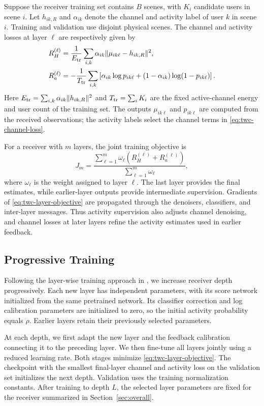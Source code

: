 Suppose the receiver training set contains $B$ scenes, with $K_i$
candidate users in scene $i$. Let $h_{ik,R}$ and $\alpha_{ik}$
denote the channel and activity label of user $k$ in scene $i$.
Training and validation use disjoint physical scenes.
The channel and activity losses at layer $\ell$ are respectively
given by
\begin{align}
 R_H^{(\ell)}&=\frac{1}{E_{\rm tr}}\sum_{i,k}
       \alpha_{ik}\|\mu_{ik\ell}-h_{ik,R}\|^2,
 \label{eq:twc-channel-loss}\\
 R_a^{(\ell)}&=-\frac{1}{T_{\rm tr}}\sum_{i,k}
       \left[\alpha_{ik}\log p_{ik\ell}
       +(1-\alpha_{ik})\log(1-p_{ik\ell})\right].
 \label{eq:twc-activity-loss}
\end{align}
Here $E_{\rm tr}=\sum_{i,k}\alpha_{ik}\|h_{ik,R}\|^2$ and
$T_{\rm tr}=\sum_i K_i$ are the fixed active-channel energy and user
count of the training set. The outputs $\mu_{ik\ell}$ and $p_{ik\ell}$
are computed from the received observations; the activity labels
select the channel terms in \eqref{eq:twc-channel-loss}.

For a receiver with $m$ layers, the joint training objective is
\begin{equation}
 J_m=\frac{\sum_{\ell=1}^{m}\omega_\ell
                  \left(R_H^{(\ell)}+R_a^{(\ell)}\right)}
                 {\sum_{\ell=1}^{m}\omega_\ell},
 \label{eq:twc-layer-objective}
\end{equation}
where $\omega_\ell$ is the weight assigned to layer $\ell$.
The last layer provides the final estimates, while earlier-layer
outputs provide intermediate supervision.
Gradients of \eqref{eq:twc-layer-objective} are propagated through
the denoisers, classifiers, and inter-layer messages. Thus activity
supervision also adjusts channel denoising, and channel losses at later
layers refine the activity estimates used in earlier feedback.

\subsection{Progressive Training}

Following the layer-wise training approach in \cite{wei2026}, we
increase receiver depth progressively. Each new layer has independent
parameters, with its score network initialized from the same
pretrained network.
Its classifier correction and log calibration parameters are
initialized to zero, so the initial activity probability equals $\rho$.
Earlier layers retain their previously selected parameters.

At each depth, we first adapt the new layer and the feedback
calibration connecting it to the preceding layer. We then fine-tune all
layers jointly using a reduced learning rate. Both stages minimize
\eqref{eq:twc-layer-objective}. The checkpoint with the smallest
final-layer channel and activity loss on the validation set initializes
the next depth. Validation uses the training normalization constants.
After training to depth $L$, the selected layer parameters are fixed
for the receiver summarized in Section~\ref{sec:overall}.
